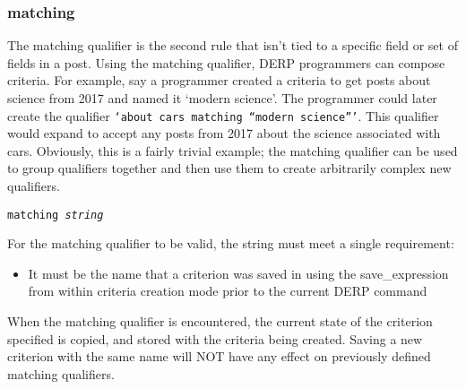 \subsubsection{matching}
The matching qualifier is the second rule that isn’t tied to a specific field or set of fields in a post. Using the matching qualifier, DERP programmers can compose criteria.
For example, say a programmer created a criteria to get posts about science from 2017 and named it ‘modern science’. The programmer could later create the qualifier \texttt{‘about cars matching “modern science”’}.
This qualifier would expand to accept any posts from 2017 about the science associated with cars. Obviously, this is a fairly trivial example; the matching qualifier can be
used to group qualifiers together and then use them to create arbitrarily complex new qualifiers.
\begin{description}[labelindent=1cm,leftmargin=\onelen,labelwidth=1cm]
      \texttt{matching \textit{string}}
\end{description}
For the matching qualifier to be valid, the string must meet a single requirement:
\begin{itemize}
\item It must be the name that a criterion was saved in using the save\_expression from within criteria creation mode prior to the current DERP command
\end{itemize}
When the matching qualifier is encountered, the current state of the criterion specified is copied, and stored with the criteria being created.
Saving a new criterion with the same name will NOT have any effect on previously defined matching qualifiers.



